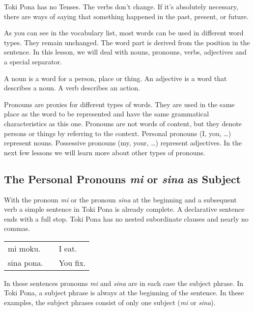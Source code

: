 Toki Pona has no Tenses. 
The verbs don't change. 
If it's absolutely necessary, there are ways of saying that something happened in the past, present, or future. 

As you can see in the vocabulary list, most words can be used in different word types. 
They remain unchanged. 
The word part is derived from the position in the sentence. 
In this lesson, we will deal with nouns, pronouns, verbs, adjectives and a special separator. 

A noun is a word for a person, place or thing. 
An adjective is a word that describes a noun. 
A verb describes an action. 

Pronouns are proxies for different types of words. 
They are used in the same place as the word to be represented and have the same grammatical characteristics as this one.
Pronouns are not words of content, but they denote persons or things by referring to the context. 
Personal pronouns (I, you, \dots) represent nouns. 
Possessive pronouns (my, your, \dots) represent adjectives. 
In the next few lessons we will learn more about other types of pronouns. 

% 
\subsection*{The Personal Pronouns \textit{mi} or \textit{sina} as Subject}
%
%
With the pronoun \textit{mi} or the pronoun \textit{sina} at the beginning and a subsequent verb a simple sentence in Toki Pona is already complete. 
A declarative sentence ends with a full stop. 
Toki Pona has no nested subordinate clauses and nearly no commas. 

\begin{supertabular}{p{5,5cm}|ll}
mi moku. && I eat. \\
sina pona. && You fix. \\
\end{supertabular} 

In these sentences pronouns \textit{mi} and \textit{sina} are in each case the subject phrase. 
In Toki Pona, a subject phrase is always at the beginning of the sentence. 
In these examples, the subject phrases consist of only one subject (\textit{mi} or \textit{sina}).

